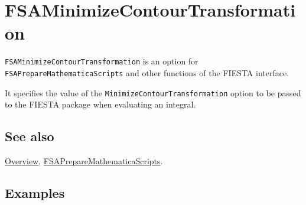 \documentclass[../FeynHelpersManual.tex]{subfiles}
\begin{document}
\hypertarget{fsaminimizecontourtransformation}{
\section{FSAMinimizeContourTransformation}\label{fsaminimizecontourtransformation}}

\texttt{FSAMinimizeContourTransformation} is an option for
\texttt{FSAPrepareMathematicaScripts} and other functions of the FIESTA
interface.

It specifies the value of the \texttt{MinimizeContourTransformation}
option to be passed to the FIESTA package when evaluating an integral.

\subsection{See also}

\hyperlink{toc}{Overview},
\hyperlink{fsapreparemathematicascripts}{FSAPrepareMathematicaScripts}.

\subsection{Examples}
\end{document}

